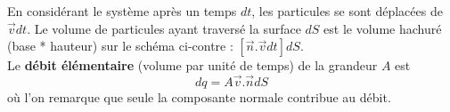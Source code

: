 En considérant le système après un temps $dt$, les particules se sont déplacées de $\vec{v}dt$. Le
volume de particules ayant traversé la surface $dS$ est le volume hachuré (base * hauteur) sur le
schéma ci-contre : $[\vec{n}.\vec{v}dt]dS$.\\
Le \textbf{débit élémentaire} (volume par unité de temps) de la grandeur $A$ est 
\begin{equation}
dq = A \vec{v}.\vec{n}dS
\end{equation}
où l'on remarque que seule la composante normale contribue au débit.
